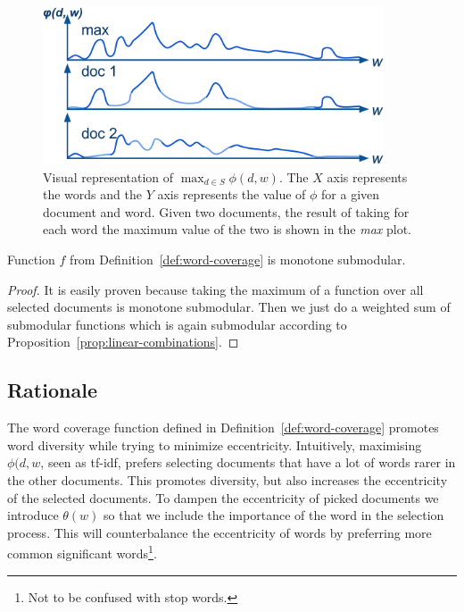 \begin{figure}
  \centering
  \includegraphics[width=0.9\textwidth,natwidth=1601,natheight=738]{images/max-phi.png}
  \caption{Visual representation of \(\max_{d \in S} \phi(d, w)\). The \(X\)
  axis represents the words and the \(Y\) axis represents the value of \(\phi\)
  for a given document and word. Given two documents, the result of taking for
    each word the maximum value of the two is shown in the \emph{max} plot.}
  \label{fig:max-phi}
\end{figure}

\begin{proposition}
  \label{prop:word-coverage}
  Function \(f\) from Definition~\ref{def:word-coverage} is monotone submodular.
  \begin{proof}
    It is easily proven because taking the maximum of a function over all
    selected documents is monotone submodular. Then we just do a weighted sum
    of submodular functions which is again submodular according to
    Proposition~\ref{prop:linear-combinations}.
  \end{proof}
\end{proposition}

\subsection{Rationale}

The word coverage function defined in Definition~\vref{def:word-coverage}
promotes word diversity while trying to minimize eccentricity. Intuitively,
maximising \(\phi(d, w\), seen as tf-idf, prefers selecting documents that have
a lot of words rarer in the other documents. This promotes diversity, but also
increases the eccentricity of the selected documents. To dampen the
eccentricity of picked documents we introduce \(\theta(w)\) so that we include
the importance of the word in the selection process. This will counterbalance
the eccentricity of words by preferring more common significant
words\footnote{Not to be confused with stop words.}.

